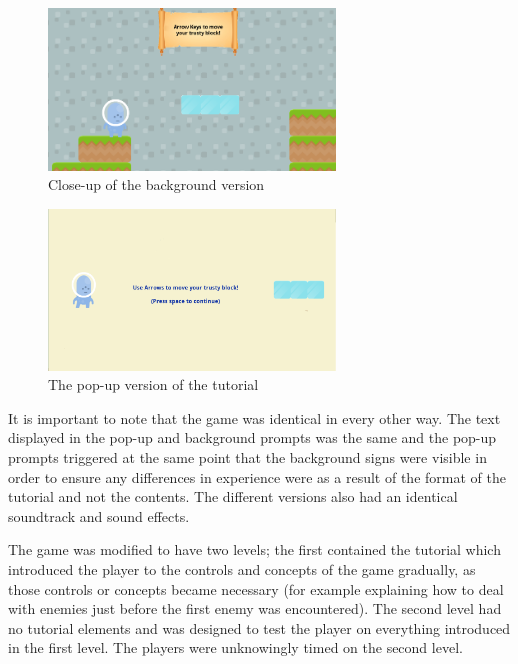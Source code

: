 \documentclass{acmsiggraph}
\begin{document}
\begin{figure}[ht]
  \centering
  \includegraphics[width=3.0in]{images/close}
  \caption{Close-up of the background version}
  \label{fig:close}
\end{figure}

\begin{figure}[ht]
  \centering
  \includegraphics[width=3.0in]{images/odd}
  \caption{The pop-up version of the tutorial}
  \label{fig:odd}
\end{figure}

It is important to note that the game was identical in every other way. The text displayed in the pop-up and background prompts was the same and the pop-up prompts triggered at the same point that the background signs were visible in order to ensure any differences in experience were as a result of the format of the tutorial and not the contents. The different versions also had an identical soundtrack and sound effects.

The game was modified to have two levels; the first contained the tutorial which introduced the player to the controls and concepts of the game gradually, as those controls or concepts became necessary (for example explaining how to deal with enemies just before the first enemy was encountered). The second level had no tutorial elements and was designed to test the player on everything introduced in the first level. The players were unknowingly timed on the second level.
\end{document}
